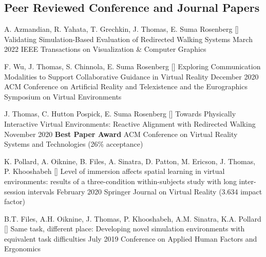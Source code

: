 

\begin{cventries}

       
  
  \vspace{-.75cm}
  \subsection*{Peer Reviewed Conference and Journal Papers}
  \cventry
    {A. Azmandian, R. Yahata, T. Grechkin, J. Thomas, E. Suma Rosenberg} %
    {[\thenpubs] Validating Simulation-Based Evaluation of Redirected Walking Systems} %
    {March 2022} %
    {} %
    {IEEE Transactions on Visualization \& Computer Graphics}%
    
  \cventry
    {F. Wu, J. Thomas, S. Chinnola, E. Suma Rosenberg} %
    {[\thenpubs] Exploring Communication Modalities to Support Collaborative Guidance in Virtual Reality} %
    {December 2020} %
    {} %
    {ACM Conference on Artificial Reality and Telexistence and the Eurographics Symposium on Virtual Environments}%
    
  \cventry
    {J. Thomas, C. Hutton Pospick, E. Suma Rosenberg} %
    {[\thenpubs] Towards Physically Interactive Virtual Environments: Reactive Alignment with Redirected Walking} %
    {November 2020} %
    {\textbf{Best Paper Award}} %
    {ACM Conference on Virtual Reality Systems and Technologies (26\% acceptance)}%
    
  \cventry
    {K. Pollard, A. Oiknine, B. Files, A. Sinatra, D. Patton, M. Ericson, J. Thomas, P. Khooshabeh}
    {[\thenpubs] Level of immersion affects spatial learning in virtual environments: results of a three-condition within-subjects study with long inter-session intervals}
    {February 2020}
    {}
    {Springer Journal on Virtual Reality (3.634 impact factor)}
    
  \cventry
    {B.T. Files, A.H. Oiknine, J. Thomas, P. Khooshabeh, A.M. Sinatra, K.A. Pollard} %
    {[\thenpubs] Same task, different place: Developing novel simulation environments with equivalent task difficulties} %
    {July 2019} %
    {} %
    {Conference on Applied Human Factors and Ergonomics} %


\end{cventries}
